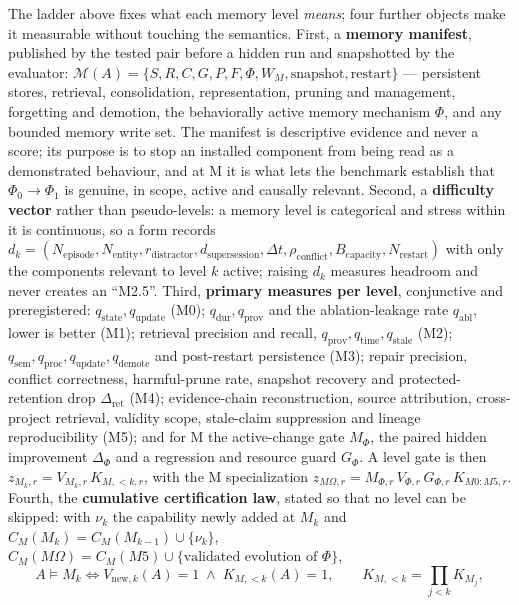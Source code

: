 The ladder above fixes what each memory level \emph{means}; four further objects make it measurable without touching the semantics. First, a \textbf{memory manifest}, published by the tested pair before a hidden run and snapshotted by the evaluator: $\mathcal M(A) = \{S, R, C, G, P, F, \Phi, W_M, \text{snapshot}, \text{restart}\}$ --- persistent stores, retrieval, consolidation, representation, pruning and management, forgetting and demotion, the behaviorally active memory mechanism $\Phi$, and any bounded memory write set. The manifest is descriptive evidence and never a score; its purpose is to stop an installed component from being read as a demonstrated behaviour, and at M\Om{} it is what lets the benchmark establish that $\Phi_0 \to \Phi_1$ is genuine, in scope, active and causally relevant. Second, a \textbf{difficulty vector} rather than pseudo-levels: a memory level is categorical and stress within it is continuous, so a form records $d_k = (N_{\mathrm{episode}}, N_{\mathrm{entity}}, r_{\mathrm{distractor}}, d_{\mathrm{supersession}}, \Delta t, \rho_{\mathrm{conflict}}, B_{\mathrm{capacity}}, N_{\mathrm{restart}})$ with only the components relevant to level $k$ active; raising $d_k$ measures headroom and never creates an ``M2.5''. Third, \textbf{primary measures per level}, conjunctive and preregistered: $q_{\mathrm{state}}, q_{\mathrm{update}}$ (M0); $q_{\mathrm{dur}}, q_{\mathrm{prov}}$ and the ablation-leakage rate $q_{\mathrm{abl}}$, lower is better (M1); retrieval precision and recall, $q_{\mathrm{prov}}, q_{\mathrm{time}}, q_{\mathrm{stale}}$ (M2); $q_{\mathrm{sem}}, q_{\mathrm{proc}}, q_{\mathrm{update}}, q_{\mathrm{demote}}$ and post-restart persistence (M3); repair precision, conflict correctness, harmful-prune rate, snapshot recovery and protected-retention drop $\Delta_{\mathrm{ret}}$ (M4); evidence-chain reconstruction, source attribution, cross-project retrieval, validity scope, stale-claim suppression and lineage reproducibility (M5); and for M\Om{} the active-change gate $M_\Phi$, the paired hidden improvement $\Delta_\Phi$ and a regression and resource guard $G_\Phi$. A level gate is then $z_{M_k,r} = V_{M_k,r}\,K_{M,<k,r}$, with the M\Om{} specialization $z_{M\Omega,r} = M_{\Phi,r}\,V_{\Phi,r}\,G_{\Phi,r}\,K_{M0{:}M5,r}$. Fourth, the \textbf{cumulative certification law}, stated so that no level can be skipped: with $\nu_k$ the capability newly added at $M_k$ and $C_M(M_k) = C_M(M_{k-1}) \cup \{\nu_k\}$, $C_M(M\Omega) = C_M(M5) \cup \{\text{validated evolution of } \Phi\}$,
\begin{equation}
A \models M_k \iff V_{\mathrm{new},k}(A) = 1 \;\wedge\; K_{M,<k}(A) = 1, \qquad K_{M,<k} = \prod_{j<k} K_{M_j},
\end{equation}
